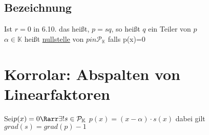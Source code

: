 \subsection*{Bezeichnung}
Ist $r = 0$ in 6.10. das heißt, $p = sq$, so heißt $q$ ein Teiler von $p$\\
$\alpha \in \mathbb{K}$ heißt \ul{nullstelle} von $p in \mathcal{P}_{\mathbb{K}}$ falls p(x)=0
\section{Korrolar: Abspalten von Linearfaktoren}
Sei$ p(x) = 0 \Rarr \exists! s \in \mathcal{P}_{\mathbb{K}}$ $p(x) = (x - \alpha) \cdot s(x)$ dabei gilt $grad(s) = grad(p) -1$